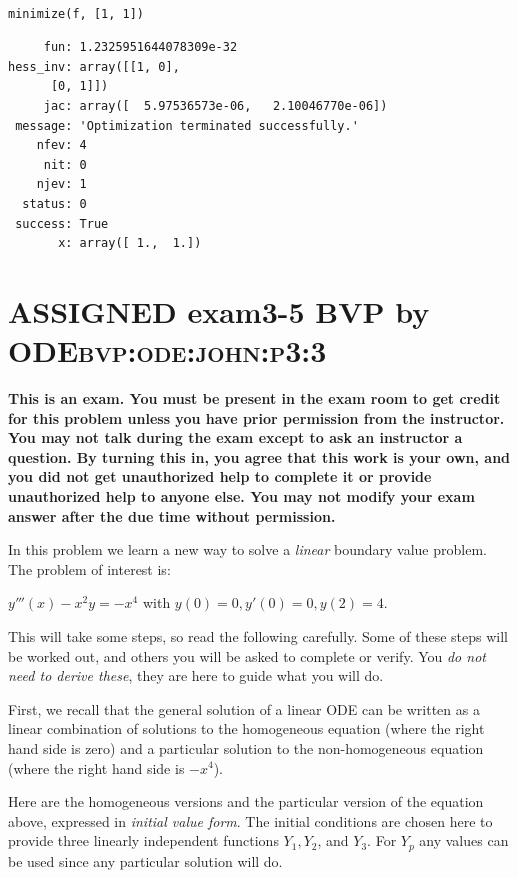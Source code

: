 \documentclass[11pt]{article}
\begin{document}
\begin{verbatim}

minimize(f, [1, 1])
\end{verbatim}

\begin{verbatim}
     fun: 1.2325951644078309e-32
hess_inv: array([[1, 0],
      [0, 1]])
     jac: array([  5.97536573e-06,   2.10046770e-06])
 message: 'Optimization terminated successfully.'
    nfev: 4
     nit: 0
    njev: 1
  status: 0
 success: True
       x: array([ 1.,  1.])
\end{verbatim}


\section{{\bfseries\sffamily ASSIGNED} exam3-5 BVP by ODE\hfill{}\textsc{bvp:ode:john:p3:3}}
\label{sec:org05820b8}
\textbf{This is an exam. You must be present in the exam room to get credit for this problem unless you have prior permission from the instructor. You may not talk during the exam except to ask an instructor a question. By turning this in, you agree that this work is your own, and you did not get unauthorized help to complete it or provide unauthorized help to anyone else. You may not modify your exam answer after the due time without permission.}

In this problem we learn a new way to solve a \emph{linear} boundary value problem. The problem of interest is:

\(y'''(x) - x^2 y = -x^4\) with \(y(0)=0, y'(0)=0, y(2)=4\).

This will take some steps, so read the following carefully. Some of these steps will be worked out, and others you will be asked to complete or verify. You \emph{do not need to derive these}, they are here to guide what you will do.

First, we recall that the general solution of a linear ODE can be written as a linear combination of solutions to the homogeneous equation (where the right hand side is zero) and a particular solution to the non-homogeneous equation (where the right hand side is \(-x^4\)).

Here are the homogeneous versions and the particular version of the equation above, expressed in \emph{initial value form}. The initial conditions are chosen here to provide three linearly independent functions \(Y_1, Y_2\), and \(Y_3\). For \(Y_p\) any values can be used since any particular solution will do.
\end{document}
